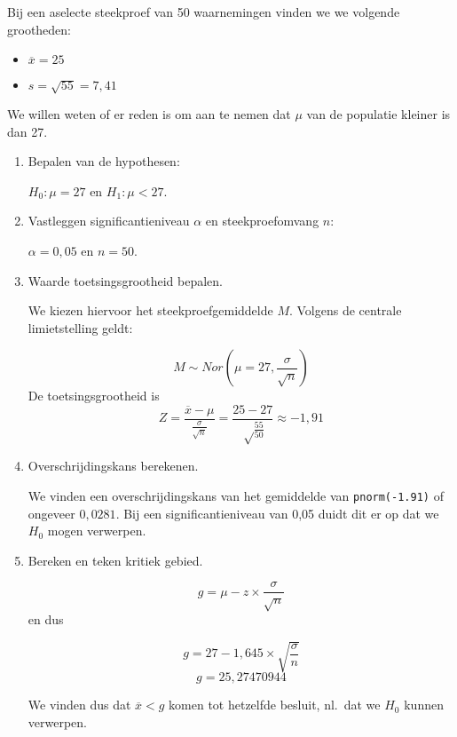 \begin{example}
  Bij een aselecte steekproef van 50 waarnemingen vinden we we volgende grootheden:
  \begin{itemize}
    \item $\overline{x} = 25$
    \item $s = \sqrt{55} = 7,41$
  \end{itemize}
  
  We willen weten of er reden is om aan te nemen dat $\mu$ van de populatie kleiner is dan 27.
  
  \begin{enumerate}
    \item Bepalen van de hypothesen: 
    
    $H_{0} : \mu = 27$ en $H_{1}: \mu < 27$.
    
    \item Vastleggen significantieniveau $\alpha$ en steekproefomvang $n$:
    
    $\alpha = 0,05$ en $n=50$.
    
    \item Waarde toetsingsgrootheid bepalen. 
    
    We kiezen hiervoor het steekproefgemiddelde $M$. Volgens de centrale limietstelling geldt:
    
    \[ M \sim Nor(\mu = 27, \frac{\sigma}{\sqrt{n}}) \]
    De toetsingsgrootheid is
    \[ Z = \frac{\overline{x} - \mu}{\frac{\sigma}{\sqrt{n}}} = \frac{25-27}{\sqrt\frac{55}{50}} \approx -1,91\]
    
    \item Overschrijdingskans berekenen.
    
    We vinden een overschrijdingskans van het gemiddelde van \texttt{pnorm(-1.91)} of ongeveer $0,0281$. Bij een significantieniveau van 0,05 duidt dit er op dat we $H_{0}$ mogen verwerpen.
    
    \item Bereken en teken kritiek gebied.
    
    \[ g = \mu - z \times \frac{\sigma}{\sqrt{n}} \]
    en dus
    
    \[ g = 27 - 1,645 \times \sqrt{\frac{\sigma}{n}} \]
    \[ g =  25,27470944 \]
    
    We vinden dus dat $\overline{x} < g$ komen tot hetzelfde besluit, nl.~dat we $H_{0}$ kunnen verwerpen.
    
  \end{enumerate}
\end{example}

